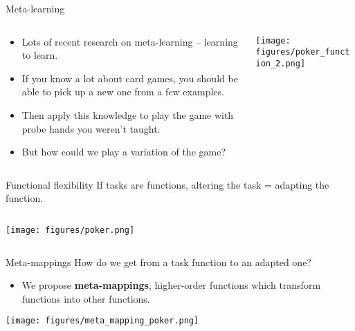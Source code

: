 \documentclass{beamer}
\begin{document}
\begin{frame}{Meta-learning}
\begin{columns}
\begin{column}{0.5\textwidth}

\begin{itemize}
    \item Lots of recent research on meta-learning -- learning to learn.
    \item If you know a lot about card games, you should be able to pick up a new one from a few examples.
    \item Then apply this knowledge to play the game with probe hands you weren't taught. 
    \item But how could we play a variation of the game? 
\end{itemize}
\end{column}

\begin{column}{0.5\textwidth}
\texttt{[image: figures/poker\_function\_2.png]}
\end{column}
\end{columns}
\end{frame}

\begin{frame}{Functional flexibility}
If tasks are functions, altering the task = adapting the function. 
\begin{columns}
\begin{column}{0.5\textwidth}
\vspace{2em}
\texttt{[image: figures/poker.png]}
\end{column}
\begin{column}{0.5\textwidth}
\vspace{2em}
\end{column}
\end{columns}
\end{frame}

\begin{frame}{Meta-mappings}
How do we get from a task function to an adapted one?
\begin{itemize}
\item We propose \textbf{meta-mappings}, higher-order functions which transform functions into other functions.
\end{itemize}
\texttt{[image: figures/meta\_mapping\_poker.png]}
\end{frame}
\end{document}
